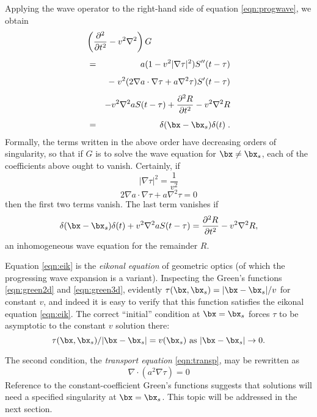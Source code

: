 Applying the wave
operator to the right-hand side of equation \ref{eqn:progwave}, we obtain
\begin{eqnarray}
\label{eqn:progwaveexp}
\lefteqn{\left(\frac{\partial^2}{\partial t^2} - v^2\nabla^2 \right)
  G} \nonumber \\[1ex]
& = & a( 1 - v^2|\nabla \tau|^2)S''(t-\tau) \nonumber\\[1ex]
  && - \;  v^2( 2\nabla a \cdot \nabla \tau +a \nabla^2 \tau)
     S'(t-\tau) \nonumber \nonumber \\[1ex]
  && - v^2\nabla^2 a S(t-\tau) 
   + \frac {\partial ^2 R}{\partial t^2} -  v^2 \nabla^2 R \nonumber \\[1ex]
&=&  \delta(\bx-\bx_s)\delta(t) \;.
\end{eqnarray}
Formally, the terms written in the above order have decreasing orders of
singularity, so that if $G$ is to solve the wave equation for $\bx \ne
\bx_s$, each of the coefficients above ought to vanish.  Certainly, if
\begin{equation} 
  \label{eqn:eik}
|\nabla \tau|^2 = \frac{1}{v^2} 
\end{equation}
\begin{equation}
   \label{eqn:transp} 
2\nabla a \cdot \nabla \tau + a\nabla
^2\tau = 0  
\end{equation}
then the first two terms vanish. The last term vanishes if
\begin{equation}
\label{eqn:rem0}
\delta(\bx-\bx_s)\delta(t) + v^2 \nabla^2 a S(t-\tau) = \frac {\partial ^2 R}{\partial t^2} -  v^2
\nabla^2 R,
\end{equation}
an inhomogeneous wave equation for the remainder $R$.

Equation \ref{eqn:eik} is the {\em eikonal equation} of geometric optics (of which the
progressing wave expansion is a variant). Inspecting the Green's functions \ref{eqn:green2d} and \ref{eqn:green3d}, evidently $\tau(\bx,\bx_s) = |\bx-\bx_s|/v$ for constant $v$, and indeed it is easy to verify that this function satisfies the eikonal equation \ref{eqn:eik}. The correct ``initial'' condition at $\bx=\bx_s$ forces $\tau$ to be asymptotic to the constant $v$ solution there:
\begin{equation}
\label{eqn:eik_init}
\tau(\bx,\bx_s)/|\bx-\bx_s| = v(\bx_s) \mbox{ as }  |\bx-\bx_s| \rightarrow 0.
\end{equation}

The second condition, the {\em transport equation} \ref{eqn:transp},
may be rewritten as
\begin{equation}
\label{eqn:transpalt}
\nabla\cdot (a^2 \nabla \tau) = 0
\end{equation}
Reference to the constant-coefficient Green's functions suggests that
solutions will need a specified singularity at $\bx=\bx_s$. This topic
will be addressed in the next section.

